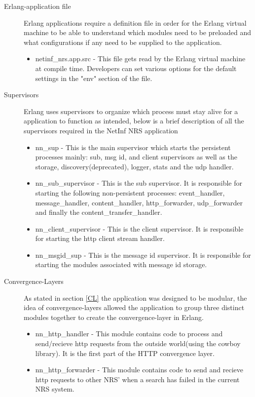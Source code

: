 \begin{description}
\item[Erlang-application file]
Erlang applications require a definition file in order for the Erlang virtual machine to be able to understand which modules need to be preloaded and what configurations if any need to be supplied to the application.
\begin{itemize}
\item netinf\_nrs.app.src - This file gets read by the Erlang virtual machine at compile time. Developers can set various options for the default settings in the "env" section of the file.
\end{itemize}
\item[Supervisors]
Erlang uses supervisors to organize which process must stay alive for a application to function as intended, below is a brief description of all the supervisors required in the NetInf NRS application
\begin{itemize}
\item nn\_sup - This is the main supervisor which starts the persistent processes mainly: sub, msg id, and client supervisors as well as the storage, discovery(deprecated), logger, stats and the udp handler.
\item nn\_sub\_supervisor - This is the sub supervisor. It is responsible for starting the following non-persistent processes: event\_handler, message\_handler, content\_handler, http\_forwarder, udp\_forwarder and finally the content\_transfer\_handler.
\item nn\_client\_supervisor - This is the client supervisor. It is responsible for starting the http client stream handler. 
\item nn\_msgid\_sup - This is the message id supervisor. It is responsible for starting the modules associated with message id storage.
\end{itemize}
\item[Convergence-Layers]
As stated in section \ref{CL} the application was designed to be modular, the idea of convergence-layers allowed the application to group three distinct modules together to create the convergence-layer in Erlang.
\begin{itemize}
\item nn\_http\_handler - This module contains code to process and send/recieve http requests from the outside world(using the cowboy library). It is the first part of the HTTP convergence layer.
\item nn\_http\_forwarder - This module contains code to send and recieve http requests to other NRS' when a search has failed in the current NRS system.

\end{itemize}
\end{description}
